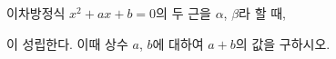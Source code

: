 이차방정식 $x^2+ax+b=0$의 두 근을 $\alpha$, $\beta$라 할 때,\par\smallskip{}\par\smallskip\noindent 이 성립한다. 이때 상수 $a$, $b$에 대하여 $a+b$의 값을 구하시오.
